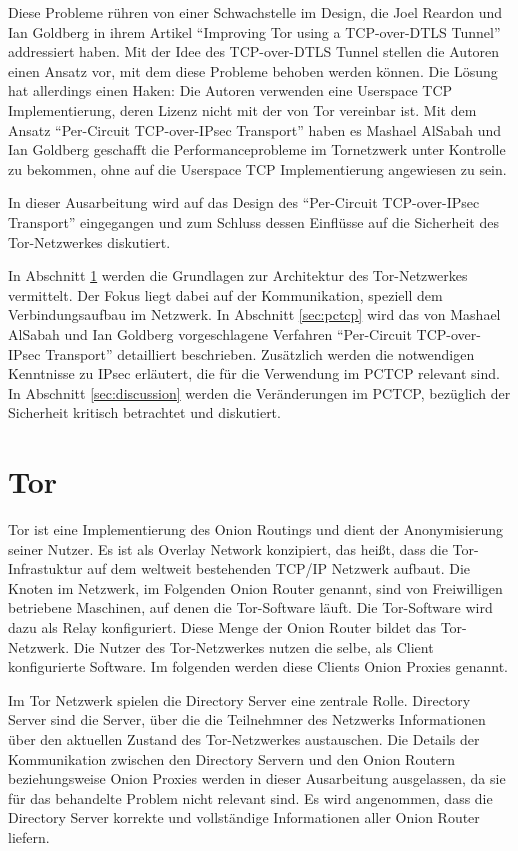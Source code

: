 \documentclass[fleqn,envcountsame,runningheads,10pt,a4paper]{llncs}
\begin{document}
Diese Probleme rühren von einer Schwachstelle im Design, die Joel Reardon und 
Ian Goldberg in ihrem Artikel ``Improving Tor using a TCP-over-DTLS 
Tunnel'' addressiert haben. Mit der Idee des TCP-over-DTLS Tunnel stellen die 
Autoren einen Ansatz vor, mit dem diese Probleme behoben werden können. Die 
Lösung hat allerdings einen Haken: Die Autoren verwenden eine Userspace TCP 
Implementierung, deren Lizenz nicht mit der von Tor vereinbar ist. Mit 
dem Ansatz ``Per-Circuit TCP-over-IPsec Transport'' haben es Mashael AlSabah und 
Ian Goldberg geschafft die Performanceprobleme im Tornetzwerk unter Kontrolle zu 
bekommen, ohne auf die Userspace TCP Implementierung angewiesen zu sein.

In dieser Ausarbeitung wird auf das Design des ``Per-Circuit TCP-over-IPsec 
Transport'' eingegangen und zum Schluss dessen Einflüsse auf die Sicherheit des 
Tor-Netzwerkes diskutiert.

In Abschnitt \ref{sec:tor} werden die Grundlagen zur Architektur des 
Tor-Netzwerkes vermittelt. Der Fokus liegt dabei auf der Kommunikation, 
speziell dem Verbindungsaufbau im Netzwerk. In Abschnitt \ref{sec:pctcp} wird 
das von Mashael AlSabah und Ian Goldberg vorgeschlagene Verfahren ``Per-Circuit 
TCP-over-IPsec Transport'' detailliert beschrieben. Zusätzlich werden die 
notwendigen Kenntnisse zu IPsec erläutert, die für die Verwendung im PCTCP 
relevant sind. In Abschnitt \ref{sec:discussion} werden die Veränderungen im 
PCTCP, bezüglich der Sicherheit kritisch betrachtet und diskutiert.

\newpage
\section{Tor}
\label{sec:tor}

Tor ist eine Implementierung des Onion Routings und dient der 
Anonymisierung seiner Nutzer. Es ist als Overlay Network konzipiert, das heißt, 
dass die Tor-Infrastuktur auf dem weltweit bestehenden TCP/IP Netzwerk 
aufbaut. Die Knoten im Netzwerk, im Folgenden Onion Router genannt, sind von 
Freiwilligen betriebene Maschinen, auf denen die Tor-Software läuft. 
Die Tor-Software wird dazu als Relay konfiguriert. Diese Menge der 
Onion Router bildet das Tor-Netzwerk. Die Nutzer des 
Tor-Netzwerkes nutzen die selbe, als Client konfigurierte Software. Im 
folgenden werden diese Clients Onion Proxies genannt.

Im Tor Netzwerk spielen die Directory Server eine zentrale Rolle. Directory 
Server sind die Server, über die die Teilnehmner des Netzwerks Informationen 
über den aktuellen Zustand des Tor-Netzwerkes austauschen. Die Details 
der Kommunikation zwischen den Directory Servern und den Onion Routern 
beziehungsweise Onion Proxies werden in dieser Ausarbeitung ausgelassen, da sie 
für das behandelte Problem nicht relevant sind. Es wird angenommen, dass die 
Directory Server korrekte und vollständige Informationen aller Onion Router 
liefern.
\end{document}
